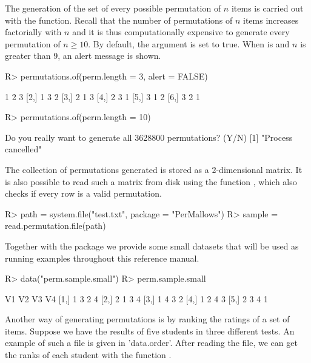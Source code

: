 \documentclass[article,nojss]{jss}
\begin{document}
The generation of the set of every possible permutation of $n$ items is carried out with the  function. Recall that the number of permutations of $n$ items increases factorially with $n$ and it is thus computationally expensive to generate every permutation of $n \ge 10$. By default, the  argument is set to true. When  is  and $n$ is greater than 9, an alert message is shown. 
\begin{Schunk}
\begin{Sinput}
R> permutations.of(perm.length = 3, alert = FALSE)
\end{Sinput}
\begin{Soutput}
     [,1] [,2] [,3]
[1,]    1    2    3
[2,]    1    3    2
[3,]    2    1    3
[4,]    2    3    1
[5,]    3    1    2
[6,]    3    2    1
\end{Soutput}
\begin{Sinput}
R> permutations.of(perm.length = 10)
\end{Sinput}
\begin{Soutput}
Do you really want to generate all  3628800  permutations? (Y/N)
[1] "Process cancelled"
\end{Soutput}
\end{Schunk}

The collection of permutations generated is stored as a 2-dimensional matrix. It is also possible to read such a matrix from disk using the function , which also checks if every row is a valid permutation. 
\begin{Schunk}
\begin{Sinput}
R> path = system.file("test.txt", package = "PerMallows")
R> sample = read.permutation.file(path)
\end{Sinput}
\end{Schunk}

Together with the  package we provide some small datasets that will be used as running examples throughout this reference manual. 
\begin{Schunk}
\begin{Sinput}
R> data("perm.sample.small")
R> perm.sample.small
\end{Sinput}
\begin{Soutput}
     V1 V2 V3 V4
[1,]  1  3  2  4
[2,]  2  1  3  4
[3,]  1  4  3  2
[4,]  1  2  4  3
[5,]  2  3  4  1
\end{Soutput}
\end{Schunk}

Another way of generating permutations is by ranking the ratings of a set of items. Suppose we have the results of five students in three different tests. An example of such a file is given in 'data.order'. After reading the file, we can get the ranks of each student with the function .
\end{document}
